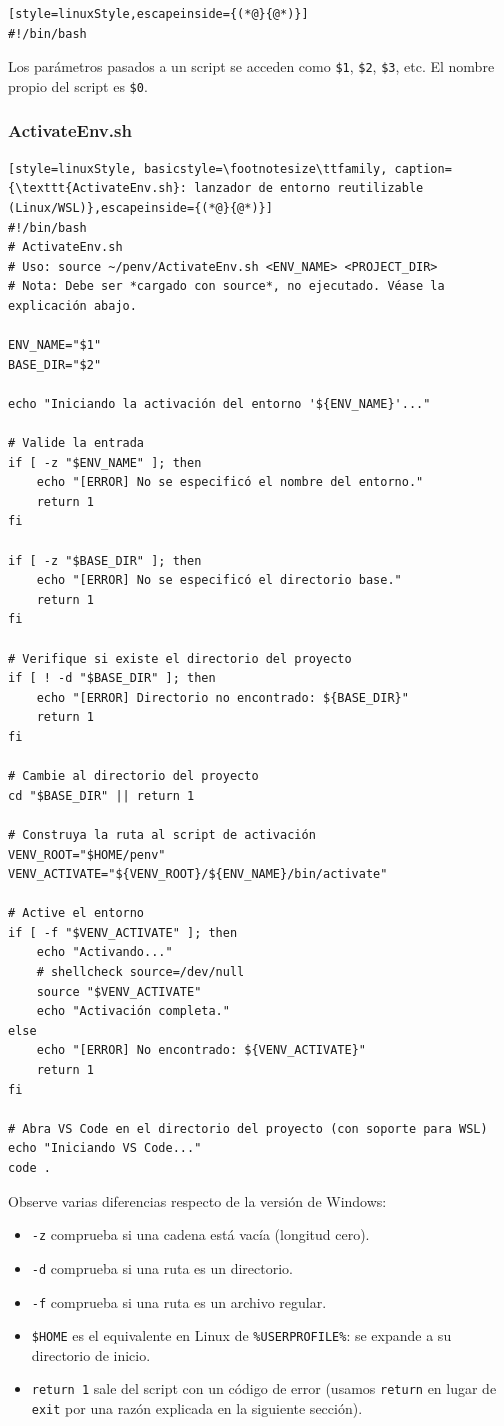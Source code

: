 \begin{lstlisting}[style=linuxStyle,escapeinside={(*@}{@*)}]
#!/bin/bash
\end{lstlisting}

Los parámetros pasados a un script se acceden como \texttt{\$1}, \texttt{\$2},
\texttt{\$3}, etc. El nombre propio del script es \texttt{\$0}.

\subsubsection{ActivateEnv.sh}

\begin{lstlisting}[style=linuxStyle, basicstyle=\footnotesize\ttfamily, caption={\texttt{ActivateEnv.sh}: lanzador de entorno reutilizable (Linux/WSL)},escapeinside={(*@}{@*)}]
#!/bin/bash
# ActivateEnv.sh
# Uso: source ~/penv/ActivateEnv.sh <ENV_NAME> <PROJECT_DIR>
# Nota: Debe ser *cargado con source*, no ejecutado. Véase la explicación abajo.

ENV_NAME="$1"
BASE_DIR="$2"

echo "Iniciando la activación del entorno '${ENV_NAME}'..."

# Valide la entrada
if [ -z "$ENV_NAME" ]; then
    echo "[ERROR] No se especificó el nombre del entorno."
    return 1
fi

if [ -z "$BASE_DIR" ]; then
    echo "[ERROR] No se especificó el directorio base."
    return 1
fi

# Verifique si existe el directorio del proyecto
if [ ! -d "$BASE_DIR" ]; then
    echo "[ERROR] Directorio no encontrado: ${BASE_DIR}"
    return 1
fi

# Cambie al directorio del proyecto
cd "$BASE_DIR" || return 1

# Construya la ruta al script de activación
VENV_ROOT="$HOME/penv"
VENV_ACTIVATE="${VENV_ROOT}/${ENV_NAME}/bin/activate"

# Active el entorno
if [ -f "$VENV_ACTIVATE" ]; then
    echo "Activando..."
    # shellcheck source=/dev/null
    source "$VENV_ACTIVATE"
    echo "Activación completa."
else
    echo "[ERROR] No encontrado: ${VENV_ACTIVATE}"
    return 1
fi

# Abra VS Code en el directorio del proyecto (con soporte para WSL)
echo "Iniciando VS Code..."
code .
\end{lstlisting}

Observe varias diferencias respecto de la versión de Windows:
\begin{itemize}
  \item \texttt{-z} comprueba si una cadena está vacía (longitud cero).
  \item \texttt{-d} comprueba si una ruta es un directorio.
  \item \texttt{-f} comprueba si una ruta es un archivo regular.
  \item \texttt{\$HOME} es el equivalente en Linux de
        \texttt{\%USERPROFILE\%}: se expande a su directorio de inicio.
  \item \texttt{return 1} sale del script con un código de error (usamos
        \texttt{return} en lugar de \texttt{exit} por una razón explicada
        en la siguiente sección).
\end{itemize}

